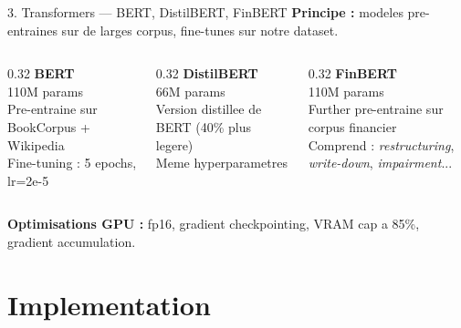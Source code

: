 \documentclass[aspectratio=169, 11pt]{beamer}
\begin{document}
\begin{frame}{3. Transformers --- BERT, DistilBERT, FinBERT}
  \textbf{Principe :} modeles pre-entraines sur de larges corpus, fine-tunes sur notre dataset.
  \vspace{0.3cm}
  \begin{columns}[T]
    \begin{column}{0.32\textwidth}
      \textbf{BERT}\\[3pt]
      {\small 110M params\\Pre-entraine sur BookCorpus + Wikipedia\\Fine-tuning : 5 epochs, lr=2e-5}
    \end{column}
    \begin{column}{0.32\textwidth}
      \textbf{DistilBERT}\\[3pt]
      {\small 66M params\\Version distillee de BERT (40\% plus legere)\\Meme hyperparametres}
    \end{column}
    \begin{column}{0.32\textwidth}
      \textbf{FinBERT}\\[3pt]
      {\small 110M params\\Further pre-entraine sur corpus financier\\Comprend : \emph{restructuring}, \emph{write-down}, \emph{impairment}...}
    \end{column}
  \end{columns}
  \vspace{0.4cm}
  \textbf{Optimisations GPU :} fp16, gradient checkpointing, VRAM cap a 85\%, gradient accumulation.
\end{frame}

\section{Implementation}
\end{document}
